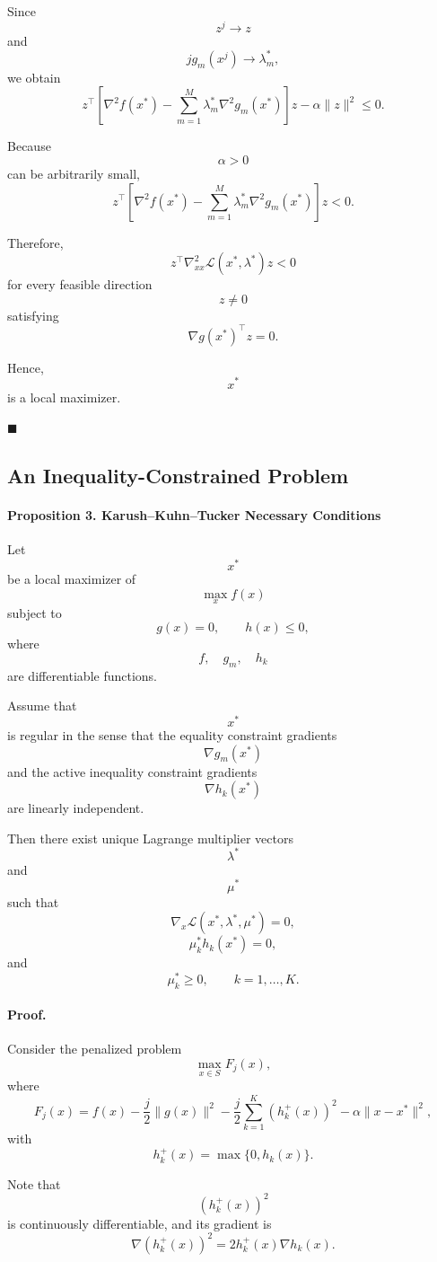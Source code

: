 Since
\[
z^j\to z
\]
and
\[
jg_m(x^j)\to\lambda_m^*,
\]
we obtain
\[
z^\top
\left[
\nabla^2f(x^*)
-
\sum_{m=1}^M
\lambda_m^*
\nabla^2g_m(x^*)
\right]
z
-
\alpha\|z\|^2
\le0.
\]

Because
\[
\alpha>0
\]
can be arbitrarily small,
\[
z^\top
\left[
\nabla^2f(x^*)
-
\sum_{m=1}^M
\lambda_m^*
\nabla^2g_m(x^*)
\right]
z
<
0.
\]

Therefore,
\[
z^\top
\nabla_{xx}^2
\mathcal L(x^*,\lambda^*)
z
<
0
\]
for every feasible direction
\[
z\neq0
\]
satisfying
\[
\nabla g(x^*)^\top z=0.
\]

Hence,
\[
x^*
\]
is a local maximizer.

\hfill\(\blacksquare\)

\subsection{An Inequality-Constrained Problem}

\paragraph{Proposition 3. Karush--Kuhn--Tucker Necessary Conditions}

Let
\[
x^*
\]
be a local maximizer of
\[
\max_x f(x)
\]
subject to
\[
g(x)=0,
\qquad
h(x)\le0,
\]
where
\[
f,
\quad
g_m,
\quad
h_k
\]
are differentiable functions.

Assume that
\[
x^*
\]
is regular in the sense that the equality constraint gradients
\[
\nabla g_m(x^*)
\]
and the active inequality constraint gradients
\[
\nabla h_k(x^*)
\]
are linearly independent.

Then there exist unique Lagrange multiplier vectors
\[
\lambda^*
\]
and
\[
\mu^*
\]
such that
\[
\nabla_x
\mathcal L(x^*,\lambda^*,\mu^*)
=
0,
\]
\[
\mu_k^*h_k(x^*)=0,
\]
and
\[
\mu_k^*\ge0,
\qquad
k=1,\dots,K.
\]


\paragraph{Proof.}

Consider the penalized problem
\[
\max_{x\in S} F_j(x),
\]
where
\[
F_j(x)
=
f(x)
-
\frac{j}{2}\|g(x)\|^2
-
\frac{j}{2}
\sum_{k=1}^K
\left(h_k^+(x)\right)^2
-
\alpha\|x-x^*\|^2,
\]
with
\[
h_k^+(x)=\max\{0,h_k(x)\}.
\]

Note that
\[
\left(h_k^+(x)\right)^2
\]
is continuously differentiable, and its gradient is
\[
\nabla\left(h_k^+(x)\right)^2
=
2h_k^+(x)\nabla h_k(x).
\]

